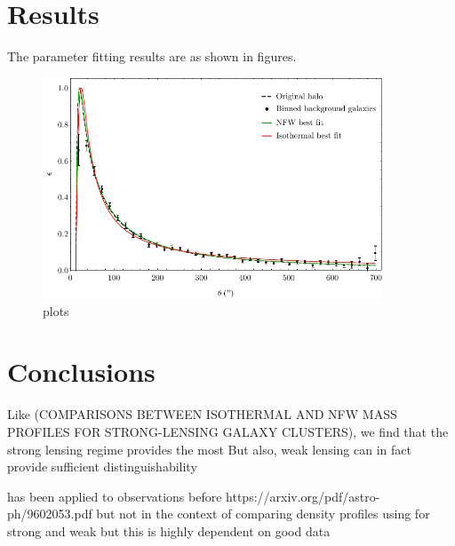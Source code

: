 \documentclass[10pt]{article}
\begin{document}
\section{Results}
The parameter fitting results are as shown in figures.



\begin{figure}
    \centering
    \includegraphics[width=0.9\textwidth]{comparison.pdf}
    \caption{plots}
    \label{}
\end{figure}



\section{Conclusions}

Like (COMPARISONS BETWEEN ISOTHERMAL AND NFW MASS PROFILES
FOR STRONG-LENSING GALAXY CLUSTERS), we find that the strong lensing regime provides the most
But also, weak lensing can in fact provide sufficient distinguishability

has been applied to observations before
https://arxiv.org/pdf/astro-ph/9602053.pdf
but not in the context of comparing density profiles using for strong and weak
but this is highly dependent on good data
\end{document}
